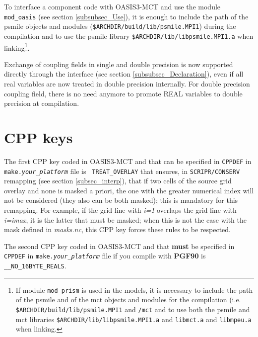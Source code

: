 To interface  a component code with OASIS3-MCT and use the module {\tt mod\_oasis} (see section \ref{subsubsec_Use}), it is enough to include the path of the psmile objects and
modules ({\tt \$ARCHDIR/build/lib/psmile.MPI1}) during the compilation and to use the psmile library {\tt \$ARCHDIR/lib/libpsmile.MPI1.a} when
linking\footnote{If module {\tt mod\_prism} is used in the models, it is necessary to
include the path of the psmile and of the mct objects and modules for
the compilation (i.e. {\tt \$ARCHDIR/build/lib/psmile.MPI1} and {\tt /mct} and to use both the psmile and mct libraries {\tt \$ARCHDIR/lib/libpsmile.MPI1.a} and {\tt libmct.a} and {\tt libmpeu.a} when linking.}.

Exchange of coupling fields in single and double precision is now supported directly through the interface 
(see section \ref{subsubsec_Declaration}), even if all real variables are now treated in double precision internally.
For double precision coupling field, there is no need anymore to promote REAL variables to double precision at compilation.

\section{CPP keys}
\label{subsec_cpp}

The first CPP key coded in OASIS3-MCT and that can be specified in
{\tt CPPDEF} in {\tt make.{\it your\_platform}} file is {\tt
  TREAT\_OVERLAY} that ensures, in {\tt SCRIPR/CONSERV}
  remapping (see section \ref{subsec_interp}), that if two cells of
  the source grid overlay and none is masked a priori, the one with the greater numerical
  index will not be considered (they also can be both masked); this is mandatory
  for this remapping. For example, if the grid line with {\it i=1} overlaps
  the grid line with {\it i=imax}, it is the latter that must be masked;
  when this is not the case with the mask defined in {\it masks.nc},
  this CPP key forces these rules to be respected.

The second CPP key coded in OASIS3-MCT and that {\bf must} be specified in
{\tt CPPDEF} in {\tt make.{\it your\_platform}} file if you compile
with {\bf PGF90} is {\tt \_\_NO\_16BYTE\_REALS}.


